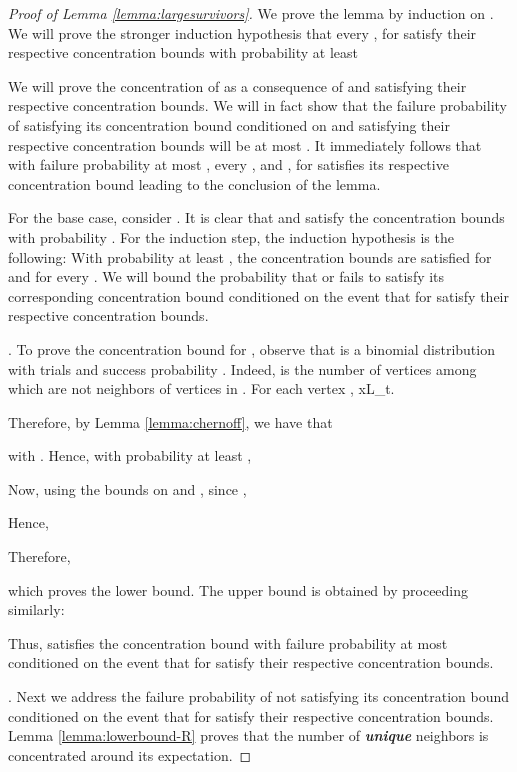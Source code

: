 \documentclass[11pt]{article}
\begin{document}
\begin{proof}[Proof of Lemma \ref{lemma:largesurvivors}]
We prove the lemma by induction on . We will prove the stronger induction hypothesis that every ,  for  satisfy their respective concentration bounds with probability at least

We will prove the concentration of  as a consequence of  and  satisfying their respective concentration bounds. We will in fact show that the failure probability of  satisfying its concentration bound conditioned on  and  satisfying their respective concentration bounds will be at most . It immediately follows that with failure probability at most , every ,  and , for  satisfies its respective concentration bound leading to the conclusion of the lemma.

For the base case, consider . It is clear that  and  satisfy the concentration bounds with probability . For the induction step, the induction hypothesis is the following: With probability at least , the concentration bounds are satisfied for  and  for every . We will bound the probability that  or  fails to satisfy its corresponding concentration bound conditioned on the event that  for  satisfy their respective concentration bounds.

. To prove the concentration bound for , observe that  is a binomial distribution with  trials and success probability . Indeed,  is the number of vertices among  which are not neighbors of vertices in . For each vertex , xL_t.

Therefore, by Lemma \ref{lemma:chernoff}, we have that


with . Hence, with probability at least ,


Now, using the bounds on  and , 
since ,


Hence, 

Therefore, 

which proves the lower bound. The upper bound is obtained by proceeding similarly:


Thus,  satisfies the concentration bound with failure probability at most  conditioned on the event that  for  satisfy their respective concentration bounds.

. Next we address the failure probability of  not satisfying its concentration bound conditioned on the event that  for  satisfy their respective concentration bounds. Lemma \ref{lemma:lowerbound-R} proves that the number of {\bf \emph{unique}} neighbors  is concentrated around its expectation.


\end{proof}
\end{document}
